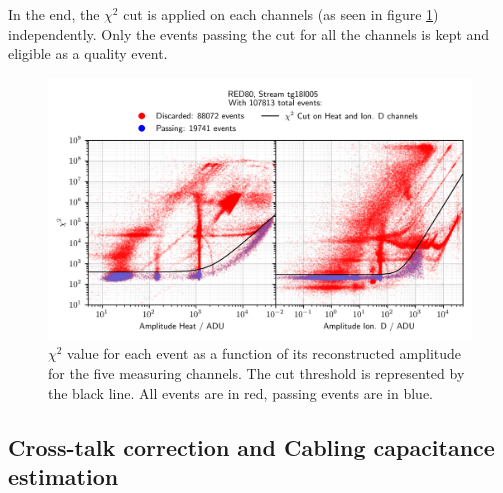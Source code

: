 In the end, the $\chi^2$ cut is applied on each channels (as seen in figure \ref{fig:chi2-cut}) independently. Only the events passing the cut for all the channels is kept and eligible as a quality event.

\begin{figure}
\centering
\includegraphics[width=\linewidth,]{Figures/ElectrodesExperimental/chi2_cut.png}
\caption{$\chi^2$ value for each event as a function of its reconstructed amplitude for the five measuring channels. The cut threshold is represented by the black line. All events are in red, passing events are in blue.}
\label{fig:chi2-cut}
\end{figure}


\subsection{Cross-talk correction and Cabling capacitance estimation}
\label{par:crosstalk}
\label{par:cross-talk}

